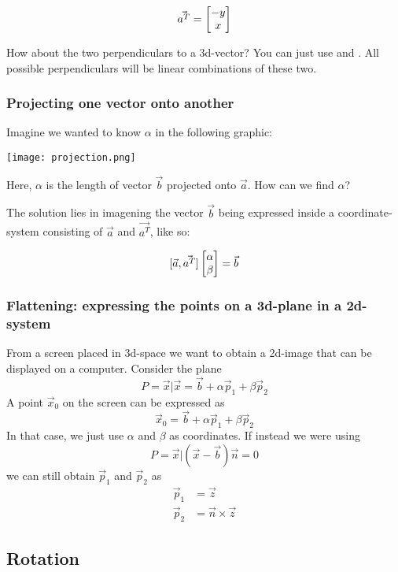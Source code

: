 $$ \vec{a^T} =  \begin{bmatrix}  -y \\ x  \\ \end{bmatrix}  $$


How about the two perpendiculars to a 3d-vector? You can just use  and . All possible perpendiculars will be linear combinations of these two.


\subsubsection{Projecting one vector onto another}

Imagine we wanted to know $\alpha$ in the following graphic:

\texttt{[image: projection.png]}

Here, $\alpha$ is the length of vector $\vec{b}$ projected onto $\vec{a}$. How can we find $\alpha$?

The solution lies in imagening the vector $\vec{b}$ being expressed inside a coordinate-system consisting of $\vec{a}$ and $\vec{a^T}$, like so: 

$$ [ \vec{a}, \vec{a^T} ]  \begin{bmatrix}  \alpha \\ \beta  \\ \end{bmatrix}  = \vec{b} $$


\subsubsection{Flattening: expressing the points on a 3d-plane in a 2d-system}
From a screen placed in 3d-space we want to obtain a 2d-image that can be displayed on a computer. Consider the plane 
$$ P = {\vec{x} | \vec{x} = \vec{b} + \alpha \vec{p}_1 + \beta \vec{p}_2}$$
A point $\vec{x}_0$ on the screen can be expressed as
$$ \vec{x}_0 = \vec{b} + \alpha \vec{p}_1 + \beta \vec{p}_2 $$
In that case, we just use $\alpha$ and $\beta$ as coordinates. If instead we were using 
$$ P = {\vec{x} | (\vec{x} - \vec{b})\vec{n} = 0} $$
we can still obtain $\vec{p}_1 $ and $ \vec{p}_2$ as 
\begin{align}
    \vec{p}_1 &= \vec{z} \\
    \vec{p}_2 &= \vec{n} \times \vec{z}
\end{align}

\subsection{Rotation}


